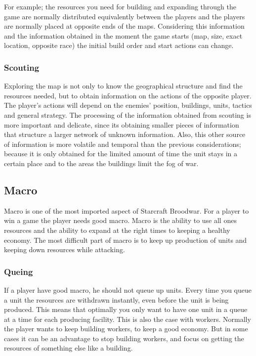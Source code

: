				For example; the resources you need for building and expanding through the game are normally distributed
				equivalently between the players and the players are normally placed at opposite ends of the maps. 
				Considering this information and the information obtained in the moment the game starts 
				(map, size, exact location, opposite race) the initial build order and start actions can change. 
		
			\subsubsection{Scouting}
				Exploring the map is not only to know the geographical structure and find the resources needed, 
				but to obtain information on the actions of the opposite player. The player's actions will depend on
				the enemies' position, buildings, units, tactics and general strategy. The processing of the information 
				obtained from scouting is more important and delicate, since its obtaining smaller pieces of information 
				that structure a larger network of unknown information. Also, this other source of information 
				is more volatile and temporal than the previous considerations; because it is only obtained for the 
				limited amount of time the unit stays in a certain place and to the areas the buildings limit the fog of war.
				
	\subsection{Macro}
		Macro is one of the most imported aspect of Starcraft Broodwar. For a player to win a game the player needs good macro. 
		Macro is the ability to use all ones resources and the ability to expand at the right times to keeping a healthy economy.
		The most difficult part of macro is to keep up production of units and keeping down resources while attacking.  
			
			\subsubsection{Queing}
				If a player have good macro, he should not queue up units. 
				Every time you queue a unit the resources are withdrawn instantly, even before 
				the unit is being produced. This means that optimally you only want to have one unit in a queue at a time for each producing facility.
				This is also the case with workers. Normally the player wants to keep building workers, to keep a good economy.
				But in some cases it can be an advantage to stop building workers, and focus on getting the resources of something else like a building.
				
